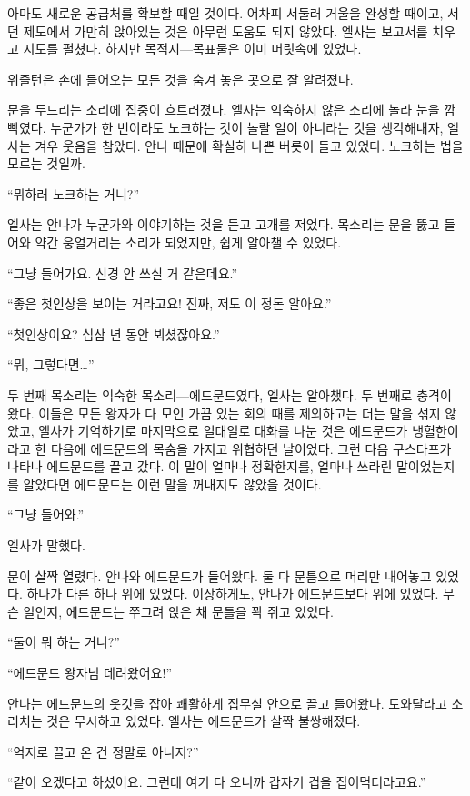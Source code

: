 아마도 새로운 공급처를 확보할 때일 것이다. 어차피 서둘러 거울을 완성할 때이고, 서던 제도에서 가만히 앉아있는 것은 아무런 도움도 되지 않았다. 엘사는 보고서를 치우고 지도를 펼쳤다. 하지만 목적지—목표물은 이미 머릿속에 있었다.

위즐턴은 손에 들어오는 모든 것을 숨겨 놓은 곳으로 잘 알려졌다.

문을 두드리는 소리에 집중이 흐트러졌다. 엘사는 익숙하지 않은 소리에 놀라 눈을 깜빡였다. 누군가가 한 번이라도 노크하는 것이 놀랄 일이 아니라는 것을 생각해내자, 엘사는 겨우 웃음을 참았다. 안나 때문에 확실히 나쁜 버릇이 들고 있었다. 노크하는 법을 모르는 것일까.

``뮈하러 노크하는 거니?''

엘사는 안나가 누군가와 이야기하는 것을 듣고 고개를 저었다. 목소리는 문을 뚫고 들어와 약간 웅얼거리는 소리가 되었지만, 쉽게 알아챌 수 있었다.

``그냥 들어가요. 신경 안 쓰실 거 같은데요.''

``좋은 첫인상을 보이는 거라고요! 진짜, 저도 이 정돈 알아요.''

``첫인상이요? 십삼 년 동안 뵈셨잖아요.''

``뭐, 그렇다면\ldots''

두 번째 목소리는 익숙한 목소리—에드문드였다, 엘사는 알아챘다. 두 번째로 충격이 왔다. 이들은 모든 왕자가 다 모인 가끔 있는 회의 때를 제외하고는 더는 말을 섞지 않았고, 엘사가 기억하기로 마지막으로 일대일로 대화를 나눈 것은 에드문드가 냉혈한이라고 한 다음에 에드문드의 목숨을 가지고 위협하던 날이었다. 그런 다음 구스타프가 나타나 에드문드를 끌고 갔다. 이 말이 얼마나 정확한지를, 얼마나 쓰라린 말이었는지를 알았다면 에드문드는 이런 말을 꺼내지도 않았을 것이다.

``그냥 들어와.''

엘사가 말했다.

문이 살짝 열렸다. 안나와 에드문드가 들어왔다. 둘 다 문틈으로 머리만 내어놓고 있었다. 하나가 다른 하나 위에 있었다. 이상하게도, 안나가 에드문드보다 위에 있었다. 무슨 일인지, 에드문드는 쭈그려 앉은 채 문틀을 꽉 쥐고 있었다.

``둘이 뭐 하는 거니?''

``에드문드 왕자님 데려왔어요!''

안나는 에드문드의 옷깃을 잡아 쾌활하게 집무실 안으로 끌고 들어왔다. 도와달라고 소리치는 것은 무시하고 있었다. 엘사는 에드문드가 살짝 불쌍해졌다.

``억지로 끌고 온 건 정말로 아니지?''

``같이 오겠다고 하셨어요. 그런데 여기 다 오니까 갑자기 겁을 집어먹더라고요.''

